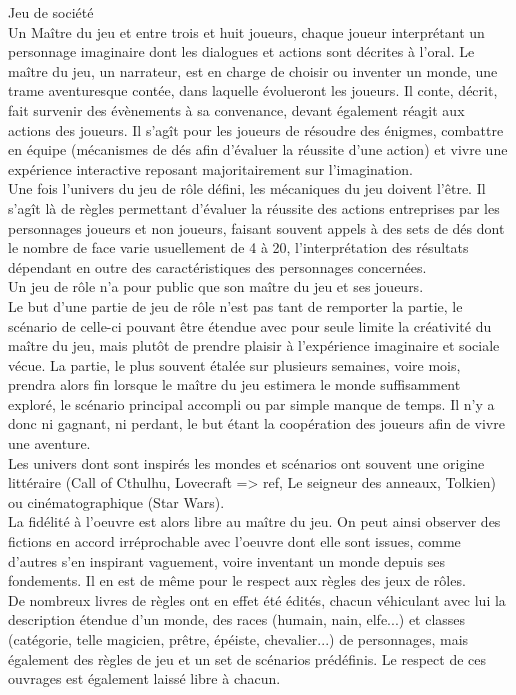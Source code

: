 Jeu de société\\
Un Maître du jeu et entre trois et huit joueurs, chaque joueur interprétant un personnage imaginaire dont les dialogues et actions sont décrites à l'oral. Le maître du jeu, un narrateur, est en charge de choisir ou inventer un monde, une trame aventuresque contée, dans laquelle évolueront les joueurs. Il conte, décrit, fait survenir des évènements à sa convenance, devant également réagit aux actions des joueurs. Il s'agît pour les joueurs de résoudre des énigmes, combattre en équipe (mécanismes de dés afin d'évaluer la réussite d'une action) et vivre une expérience interactive reposant majoritairement sur l'imagination.\\
Une fois l'univers du jeu de rôle défini, les mécaniques du jeu doivent l'être. Il s'agît là de règles permettant d'évaluer la réussite des actions entreprises par les personnages joueurs et non joueurs, faisant souvent appels à des sets de dés dont le nombre de face varie usuellement de 4 à 20, l'interprétation des résultats dépendant en outre des caractéristiques des personnages concernées.\\
Un jeu de rôle n'a pour public que son maître du jeu et ses joueurs.\\
Le but d'une partie de jeu de rôle n'est pas tant de remporter la partie, le scénario de celle-ci pouvant être étendue avec pour seule limite la créativité du maître du jeu, mais plutôt de prendre plaisir à l'expérience imaginaire et sociale vécue. La partie, le plus souvent étalée sur plusieurs semaines, voire mois, prendra alors fin lorsque le maître du jeu estimera le monde suffisamment exploré, le scénario principal accompli ou par simple manque de temps. Il n'y a donc ni gagnant, ni perdant, le but étant la coopération des joueurs afin de vivre une aventure.\\

Les univers dont sont inspirés les mondes et scénarios ont souvent une origine littéraire (Call of Cthulhu, Lovecraft => ref, Le seigneur des anneaux, Tolkien) ou cinématographique (Star Wars).\\
La fidélité à l'oeuvre est alors libre au maître du jeu. On peut ainsi observer des fictions en accord irréprochable avec l'oeuvre dont elle sont issues, comme d'autres s'en inspirant vaguement, voire inventant un monde depuis ses fondements. Il en est de même pour le respect aux règles des jeux de rôles.\\
De nombreux livres de règles ont en effet été édités, chacun véhiculant avec lui la description étendue d'un monde, des races (humain, nain, elfe...) et classes (catégorie, telle magicien, prêtre, épéiste, chevalier...) de personnages, mais également des règles de jeu et un set de scénarios prédéfinis. Le respect de ces ouvrages est également laissé libre à chacun.\\

